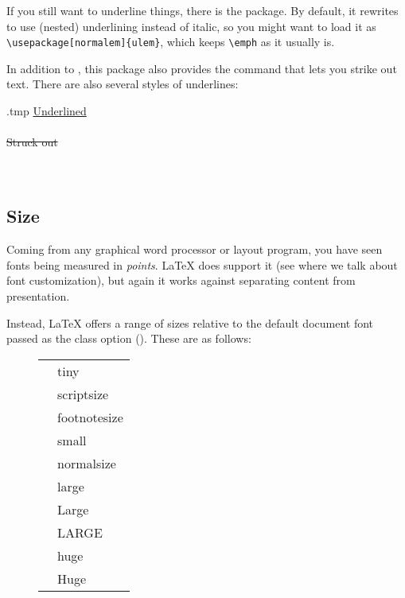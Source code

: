 If you still want to underline things, there is the  package.
By default, it rewrites  to use (nested) underlining instead of italic,
so you might want to load it as \verb|\usepackage[normalem]{ulem}|,
which keeps \verb|\emph| as it usually is.

In addition to , this package also provides the  command
that lets you strike out text.
There are also several styles of underlines:
%
\begin{VerbatimOut}{\jobname.tmp}
\uline{Underlined}\\
\\
\sout{Struck out}\\
\\
\\
\end{VerbatimOut}
\ShowExample


%
%
\subsection{Size}

Coming from any graphical word processor or layout program,
you have seen fonts being measured in \emph{points}.
\LaTeX{} does support it (see  where we talk about font customization),
but again it works against separating content from presentation.

Instead, \LaTeX{} offers a range of sizes relative to the default document font
passed as the class option ().
These are as follows:
%
\begin{figure}[h]
\centering
\newcommand{\example}[1]{\cmd{#1}\texttt &%
    \csname#1\endcsname{Example text}}
\begin{tabular}{l|l}
\example{tiny}\\
\example{scriptsize}\\
\example{footnotesize}\\
\example{small}\\
\example{normalsize}\\
\example{large}\\
\example{Large}\\
\example{LARGE}\\
\example{huge}\\
\example{Huge}
\end{tabular}
\end{figure}

